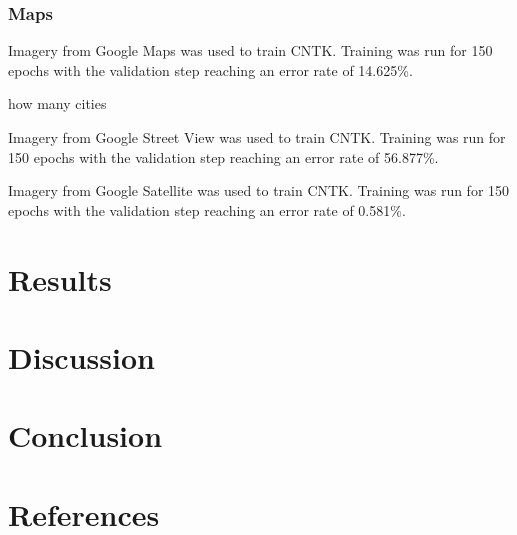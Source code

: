 \documentclass[final,3p,times,authoryear]{elsarticle}
\begin{document}
\subsubsection{Maps}
Imagery from Google Maps was used to train CNTK. Training was run for 150 epochs with the validation step reaching an error rate of 14.625\%. 

how many cities



Imagery from Google Street View was used to train CNTK. Training was run for 150 epochs with the validation step reaching an error rate of 56.877\%.




Imagery from Google Satellite was used to train CNTK. Training was run for 150 epochs with the validation step reaching an error rate of 0.581\%.














\section{Results}\label{sec:results}

\section{Discussion}\label{sec:discussion}

\section{Conclusion}\label{sec:conclusion}


\section*{References}\label{sec:ref}
   
  


\begin{thebibliography}{00}


\bibitem[ ()]{}

\end{thebibliography}


\appendix
\setcounter{table}{0}
\renewcommand{\thetable}{A\arabic{table}}

\end{document}
